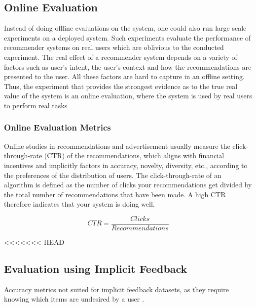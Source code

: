 
\subsection{Online Evaluation}

Instead of doing offline evaluations on the system, one could also run large
scale experiments on a deployed system. Such experiments evaluate the
performance of recommender systems on real users which are oblivious to the
conducted experiment. The real effect of a recommender system depends on a
variety of factors such as user’s intent, the user’s context and how the
recommendations are presented to the user. All these factors are hard to
capture in an offline setting. Thus, the experiment that provides the strongest evidence as to the true real value of the system is an online evaluation, where the system is used by real users to perform real tasks

\subsubsection{Online Evaluation Metrics}

Online studies in recommendations and advertisement usually measure the click-through-rate (CTR) of the recommendations,
which aligns with financial incentives and implicitly factors in accuracy,
novelty, diversity, etc., according to the preferences of the distribution of users.
The click-through-rate of an algorithm is defined as the number of clicks your
recommendations get divided by the total number of recommendations that
have been made. A high CTR therefore indicates that your system is doing
well.

\begin{equation}
CTR = \frac{Clicks}{Recommendations}
\end{equation}

<<<<<<< HEAD
\subsection{Evaluation using Implicit Feedback}

Accuracy metrics not suited for implicit feedback datasets, as they require
knowing which items are undesired by a user \cite{Hu2008}.

